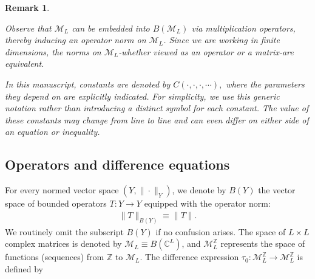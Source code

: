 \documentclass[12pt,oneside,onecolumn,open]{article}
\newtheorem{obs}[teo]{Remark}
\begin{document}
\begin{obs} \label{COP}

Observe that \( \mathcal{M}_L \) can be embedded into \( B(\mathcal{M}_L) \) via multiplication operators, thereby inducing an operator norm on \( \mathcal{M}_L \). Since we are working in finite dimensions, the norms on \( \mathcal{M}_L \)-whether viewed as an operator or a matrix-are equivalent.

In this manuscript, constants are denoted by $C( \cdot, \cdot, \cdot,  \cdots ) ,$ where the parameters they depend on are explicitly indicated. For simplicity, we use this generic notation rather than introducing a distinct symbol for each constant. The value of these constants may change from line to line and can even differ on either side of an equation or inequality.




    
\end{obs}  


\subsection{Operators and difference equations}\label{sec1.1}

For every normed vector space $(Y, \| \cdot  \|_{Y})$, we denote by $ B(Y) $ the vector space of bounded operators $ T :  Y \to Y $ equipped with the operator  norm:  
\begin{align}
    \|  T \|_{B(Y)} \equiv    \|  T \|. 
    \end{align}
We routinely omit the subscript $B(Y)$ if no confusion arises. The space of $L \times L$ complex matrices is denoted by $\mathcal{M}_L \equiv B( \mathbb{C}^L) $, and $\mathcal{M}_L^{\mathbb{Z}}$ represents the space of functions (sequences) from $\mathbb{Z}$ to $\mathcal{M}_L$. The difference expression $\tau_0: \mathcal{M}_L^{\mathbb{Z}} \to \mathcal{M}_L^{\mathbb{Z}} $ is defined by
\end{document}
